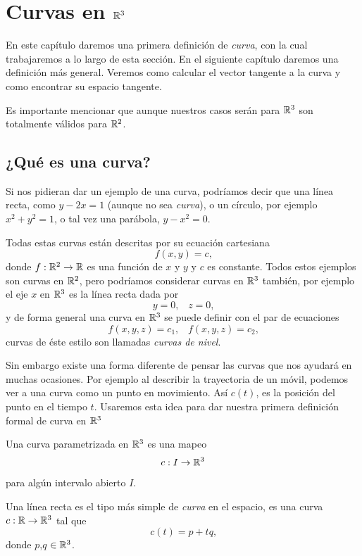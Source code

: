 \chapter{Curvas en $\mathbb{R}^{3}$}\label{ch:curvas-en-r3}

En este capítulo daremos una primera definición de \emph{curva}, con la cual trabajaremos
a lo largo de esta sección. En el siguiente capítulo daremos una definición más general.
Veremos como calcular el vector tangente a la curva y como encontrar su espacio tangente.

Es importante mencionar que aunque nuestros casos serán para $\mathbb{R}^{3}$ son totalmente
válidos para $\mathbb{R}^{2}$.

\section{¿Qu\'e es una curva?}

Si nos pidieran dar un ejemplo de una curva, podr\'iamos decir que una l\'inea recta, como
$y-2x=1$ (aunque no sea \emph{curva}), o un c\'irculo, por ejemplo $x^{2} + y^{2} = 1$, 
o tal vez una par\'abola, $y-x^{2}=0$.

Todas estas curvas est\'an descritas por su ecuaci\'on cartesiana
$$ f(x,y) = c \text{,} $$
donde $f:\mathbb{R}^{2} \rightarrow \mathbb{R}$ es una funci\'on de $x$ y $y$ y $c$ es constante. Todos estos ejemplos son curvas
en $\mathbb{R}^{2}$, pero podr\'iamos considerar curvas en $\mathbb{R}^{3}$ tambi\'en, por ejemplo
el eje $x$ en $\mathbb{R}^{3}$ es la l\'inea recta dada por
$$y=0\text{,} \quad z=0 \text{,}$$
y de forma general una curva en $\mathbb{R}^{3}$ se puede definir con el par de ecuaciones
$$ f(x,y,z)=c_{1}\text{,}\quad f(x,y,z)=c_{2} \text{,}$$
curvas de \'este estilo son llamadas \emph{curvas de nivel}.

Sin embargo existe una forma diferente de pensar las curvas que nos ayudar\'a en muchas ocasiones. Por ejemplo al describir la trayectoria de un m\'ovil, podemos ver a una curva como un punto en movimiento. As\'i
$c(t)$, es la posici\'on del punto en el tiempo $t$. Usaremos esta idea para dar nuestra
primera definici\'on formal de curva en $\mathbb{R}^{3}$

\begin{definition}
    Una curva parametrizada en $\mathbb{R}^{3}$ es una mapeo 
    $$c:I \rightarrow \mathbb{R}^{3}$$
    para alg\'un intervalo abierto $I$.
\end{definition}

\begin{example}
    Una línea recta es el tipo más simple de \emph{curva} en el espacio, es una curva
    $c:\mathbb{R} \rightarrow \mathbb{R}^{3}$ tal que
    $$ c(t) = p + tq \text{,}$$
    donde $p$,$q$ $\in \mathbb{R}^{3}$.
\end{example}

